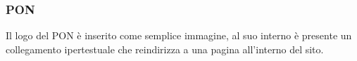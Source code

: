 \documentclass{article}
\begin{document}
\begin{figure}[H]
		\label{fig:example}%
	\end{figure}

	\subsubsection{\textbf{PON}}
	Il logo del PON è inserito come semplice immagine, al suo interno è presente un collegamento ipertestuale che reindirizza a una pagina all'interno del sito.
\end{document}
